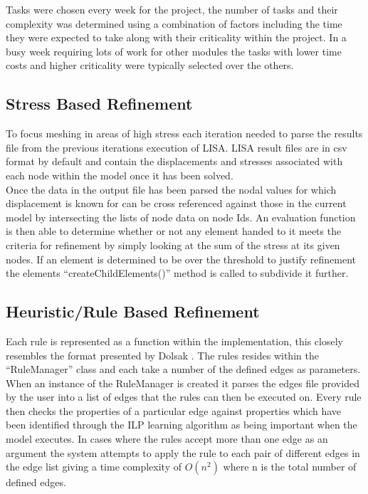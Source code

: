 \noindent
Tasks were chosen every week for the project, the number of tasks and their complexity was determined using a combination of factors including the time they were expected to take along with their criticality within the project. In a busy week requiring lots of work for other modules the tasks with lower time costs and higher criticality were typically selected over the others.

\subsection{Stress Based Refinement}
To focus meshing in areas of high stress each iteration needed to parse the results file from the previous iterations execution of LISA. LISA result files are in csv format by default and contain the displacements and stresses associated with each node within the model once it has been solved. \\

\noindent
Once the data in the output file has been parsed the nodal values for which displacement is known for can be cross referenced against those in the current model by intersecting the lists of node data on node Ids. An evaluation function is then able to determine whether or not any element handed to it meets the criteria for refinement by simply looking at the sum of the stress at its given nodes. If an element is determined to be over the threshold to justify refinement the elements ``createChildElements()'' method is called to subdivide it further. \\


\subsection{Heuristic/Rule Based Refinement}
Each rule is represented as a function within the implementation, this closely resembles the format presented by Dolsak \cite{DolsakPaper91, DolsakPaper94, appOfILPToFEMeshDesign} \cite{ConsultRuleIntelltSystemFE}. The rules resides within the ``RuleManager'' class and each take a number of the defined edges as parameters. When an instance of the RuleManager is created it parses the edges file provided by the user into a list of edges that the rules can then be executed on. Every rule then checks the properties of a particular edge against properties which have been identified through the ILP learning algorithm as being important when the model executes. In cases where the rules accept more than one edge as an argument the system attempts to apply the rule to each pair of different edges in the edge list giving a time complexity of $O(n^2)$ where n is the total number of defined edges.\\

